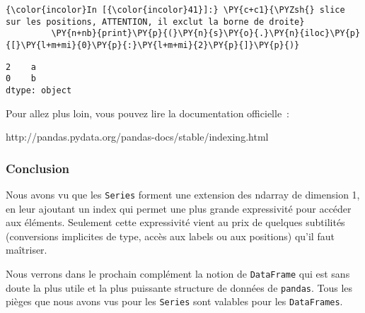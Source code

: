     \begin{Verbatim}[commandchars=\\\{\},frame=single,framerule=0.3mm,rulecolor=\color{cellframecolor}]
{\color{incolor}In [{\color{incolor}41}]:} \PY{c+c1}{\PYZsh{} slice sur les positions, ATTENTION, il exclut la borne de droite}
         \PY{n+nb}{print}\PY{p}{(}\PY{n}{s}\PY{o}{.}\PY{n}{iloc}\PY{p}{[}\PY{l+m+mi}{0}\PY{p}{:}\PY{l+m+mi}{2}\PY{p}{]}\PY{p}{)}
\end{Verbatim}


    \begin{Verbatim}[commandchars=\\\{\},frame=single,framerule=0.3mm,rulecolor=\color{cellframecolor}]
2    a
0    b
dtype: object
\end{Verbatim}

    Pour allez plus loin, vous pouvez lire la documentation officielle~:

http://pandas.pydata.org/pandas-docs/stable/indexing.html

    \hypertarget{conclusion}{%
\subsubsection{Conclusion}\label{conclusion}}

    Nous avons vu que les \texttt{Series} forment une extension des ndarray
de dimension 1, en leur ajoutant un index qui permet une plus grande
expressivité pour accéder aux éléments. Seulement cette expressivité
vient au prix de quelques subtilités (conversions implicites de type,
accès aux labels ou aux positions) qu'il faut maîtriser.

Nous verrons dans le prochain complément la notion de \texttt{DataFrame}
qui est sans doute la plus utile et la plus puissante structure de
données de \texttt{pandas}. Tous les pièges que nous avons vus pour les
\texttt{Series} sont valables pour les \texttt{DataFrames}.


    
    
    
